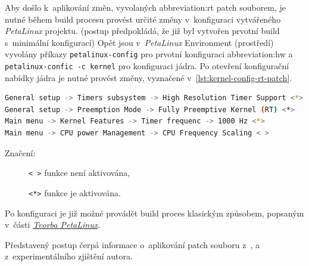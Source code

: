 \documentclass[a4paper, twoside, 11pt]{article}
\begin{document}
				Aby došlo k~aplikování změn, vyvolaných \gls{abbreviation:rt} patch souborem, je nutné během build procesu provést určité změny v~konfiguraci vytvářeného \textit{PetaLinux} projektu. (postup předpokládá, že již byl vytvořen prvotní build s~minimální konfigurací) Opět jsou v~\textit{PetaLinux} Environment (prostředí) vyvolány příkazy \texttt{petalinux-config} pro prvotní konfiguraci \gls{abbreviation:hw} a \texttt{petalinux-confic -c kernel} pro konfiguraci jádra. Po otevření konfigurační nabídky jádra je nutné provést změny, vyznačené v~\ref{lst:kernel-config-rt-patch}.

				\begin{lstlisting}[language={sh}, caption={Úpravy v~konfiguraci jádra pro \gls{abbreviation:rt} patch.}, label= {lst:kernel-config-rt-patch}]
General setup -> Timers subsystem -> High Resolution Timer Support <*>
General setup -> Preemption Mode -> Fully Preemptive Kernel (RT) <*>
Main menu -> Kernel Features -> Timer frequenc -> 1000 Hz <*>
Main menu -> CPU power Management -> CPU Frequency Scaling < >\end{lstlisting}

				\noindent Značení:
				\begin{description}
					\item[] \texttt{< >} funkce není aktivována,
					\item[] \texttt{<*>} funkce je aktivována.
				\end{description}

				Po konfiguraci je již možné provádět build proces klasickým způsobem, popsaným v~části \hyperref[subsec:tvorba-petalinux]{\textit{Tvorba PetaLinux}}.\par
				Představený postup čerpá informace o~aplikování patch souboru z~\cite{hackster-real-time-optimization-in-petalinux-with-rt-patch-on-mpsoc}, \cite{trenz-electronic-wiki-how-to-install-the-linux-rt} a z~experimentálního zjištění autora.\par


			
\end{document}
